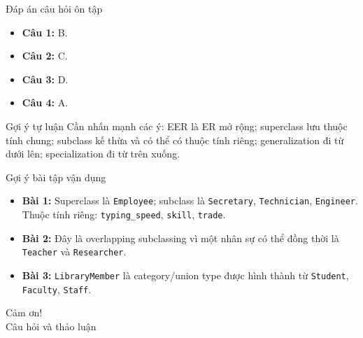\documentclass[aspectratio=169,11pt]{beamer}
\newcommand{\codeword}[1]{\texttt{#1}}
\begin{document}
\begin{frame}{Đáp án câu hỏi ôn tập}
\begin{itemize}
    \item \textbf{Câu 1:} B.
    \item \textbf{Câu 2:} C.
    \item \textbf{Câu 3:} D.
    \item \textbf{Câu 4:} A.
\end{itemize}

\begin{block}{Gợi ý tự luận}
Cần nhấn mạnh các ý: EER là ER mở rộng; superclass lưu thuộc tính chung; subclass kế thừa và có thể có thuộc tính riêng; generalization đi từ dưới lên; specialization đi từ trên xuống.
\end{block}
\end{frame}

\begin{frame}{Gợi ý bài tập vận dụng}
\begin{itemize}
    \item \textbf{Bài 1:} Superclass là \codeword{Employee}; subclass là \codeword{Secretary}, \codeword{Technician}, \codeword{Engineer}. Thuộc tính riêng: \codeword{typing\_speed}, \codeword{skill}, \codeword{trade}.
    \item \textbf{Bài 2:} Đây là overlapping subclassing vì một nhân sự có thể đồng thời là \codeword{Teacher} và \codeword{Researcher}.
    \item \textbf{Bài 3:} \codeword{LibraryMember} là category/union type được hình thành từ \codeword{Student}, \codeword{Faculty}, \codeword{Staff}.
\end{itemize}
\end{frame}

\begin{frame}
\centering
\Huge Cảm ơn!\\[0.5cm]
\Large Câu hỏi và thảo luận
\end{frame}
\end{document}
